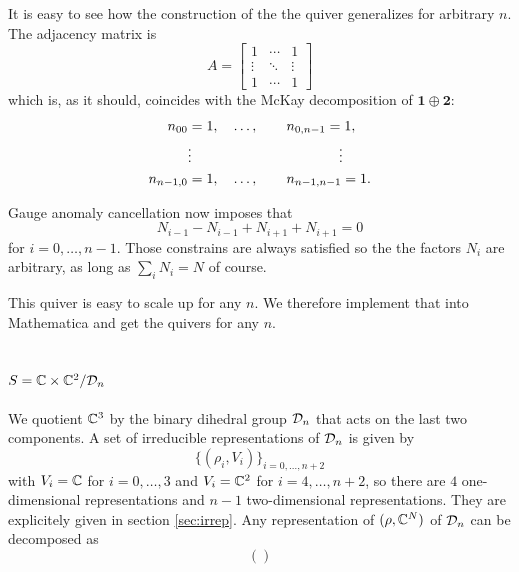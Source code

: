         It is easy to see how the construction of the the quiver generalizes for arbitrary $n$. The adjacency matrix is
        \begin{equation}
            A=
            \begin{bmatrix}
                1 & \cdots & 1 \\
                \vdots & \ddots & \vdots \\
                1 & \cdots & 1
            \end{bmatrix}
        \end{equation}
        which is, as it should, coincides with the McKay decomposition of $\boldsymbol{1}\oplus\boldsymbol{2}$:
        \begin{align}
            \begin{split}
                n_{00} &= 1,\quad\dots,\qquad n_{0,n-1}=1,\\
                &\vdots\hspace{3.7cm}\vdots\\
                n_{n-1,0} &= 1,\quad\dots,\qquad n_{n-1,n-1}=1.
            \end{split}
        \end{align}
        
        Gauge anomaly cancellation now imposes that
        \begin{equation}
            N_{i-1}-N_{i-1}+N_{i+1}+N_{i+1}=0
        \end{equation}
        for $i=0,\dots,n-1$. Those constrains are always satisfied so the the factors $N_i$ are arbitrary, as long as $\sum_iN_i=N$ of course.

        This quiver is easy to scale up for any $n$. We therefore implement that into Mathematica and get the quivers for any $n$.

    \subsection{$S=\mathbb{C}\times\mathbb{C}^2/\mathcal{D}_n$}

        We quotient $\mathbb{C}^3$ by the binary dihedral group $\mathcal{D}_n$ that acts on the last two components. A set of irreducible representations of $\mathcal{D}_n$ is given by
        \begin{equation}
            \{(\rho_i,V_i)\}_{i=0,\dots,n+2}
        \end{equation}
        with $V_i=\mathbb{C}$ for $i=0,\dots,3$ and $V_i=\mathbb{C}^2$ for $i=4,\dots,n+2$, so there are $4$ one-dimensional representations and $n-1$ two-dimensional representations. They are explicitely given in section \ref{sec:irrep}. Any representation of $(\rho,\mathbb{C}^N)$ of $\mathcal{D}_n$ can be decomposed as
        \begin{equation}
            ()
        \end{equation}
        
